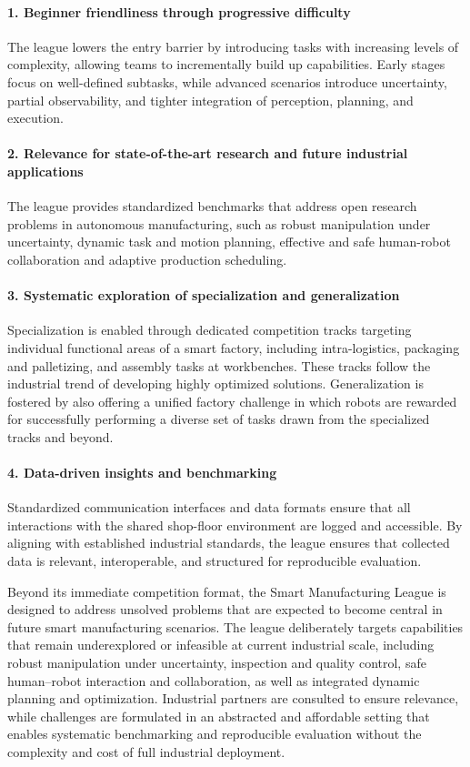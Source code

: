 \documentclass[letterpaper, 11pt]{extarticle}
\begin{document}
\paragraph{1. Beginner friendliness through progressive difficulty}
The league lowers the entry barrier by introducing tasks with increasing levels of complexity, allowing teams to incrementally build up capabilities. Early stages focus on well-defined subtasks, while advanced scenarios introduce uncertainty, partial observability, and tighter integration of perception, planning, and execution.

\paragraph{2. Relevance for state-of-the-art research and future industrial applications}
The league provides standardized benchmarks that address open research problems in autonomous manufacturing, such as robust manipulation under uncertainty, dynamic task and motion planning, effective and safe human-robot collaboration and adaptive production scheduling.

\paragraph{3. Systematic exploration of specialization and generalization}
Specialization is enabled through dedicated competition tracks targeting individual functional areas of a smart factory, including intra-logistics, packaging and palletizing, and assembly tasks at workbenches.
These tracks follow the industrial trend of developing highly optimized solutions.
Generalization is fostered by also offering a unified factory challenge in which robots are rewarded for successfully performing a diverse set of tasks drawn from the specialized tracks and beyond.

\paragraph{4. Data-driven insights and benchmarking}
Standardized communication interfaces and data formats ensure that all interactions with the shared shop-floor environment are logged and accessible.
By aligning with established industrial standards, the league ensures that collected data is relevant, interoperable, and structured for reproducible evaluation.

Beyond its immediate competition format, the Smart Manufacturing League is designed to address unsolved problems that are expected to become central in future smart manufacturing scenarios. The league deliberately targets capabilities that remain underexplored or infeasible at current industrial scale, including robust manipulation under uncertainty, inspection and quality control, safe human–robot interaction and collaboration, as well as integrated dynamic planning and optimization. Industrial partners are consulted to ensure relevance, while challenges are formulated in an abstracted and affordable setting that enables systematic benchmarking and reproducible evaluation without the complexity and cost of full industrial deployment.
\end{document}
